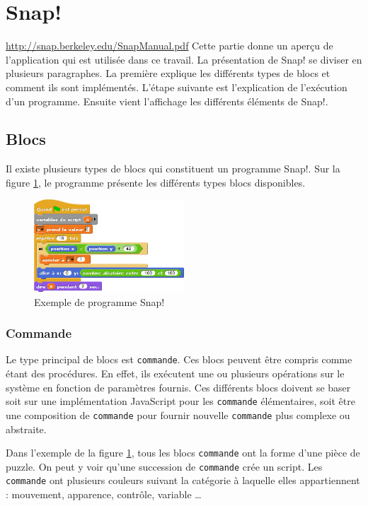 \section{Snap!}
\url{http://snap.berkeley.edu/SnapManual.pdf} %
Cette partie donne un aperçu de l'application qui est utilisée dans ce travail. La présentation de Snap! se diviser en plusieurs paragraphes. La première explique les différents types de blocs et comment ils sont implémentés. L'étape suivante est l'explication de l'exécution d'un programme. Ensuite vient l'affichage les différents éléments de Snap!. %

\subsection{Blocs}
Il existe plusieurs types de blocs qui constituent un programme Snap!. Sur la figure \ref{fig:software-used-script}, le programme présente les différents types blocs disponibles.
\begin{figure}
  \begin{center}
    \includegraphics[width=0.5\textwidth]{content/5-related_work/images/script}
    \caption{Exemple de programme Snap!}
    \label{fig:software-used-script}
  \end{center}
\end{figure}

\subsubsection{Commande}
Le type principal de blocs est \texttt{commande}. Ces blocs peuvent être compris comme étant des procédures. En effet, ils exécutent une ou plusieurs opérations sur le système en fonction de paramètres fournis. Ces différents blocs doivent se baser soit sur une implémentation JavaScript pour les \texttt{commande} élémentaires, soit être une composition de \texttt{commande} pour fournir nouvelle \texttt{commande} plus complexe ou abstraite.

Dans l'exemple de la figure \ref{fig:software-used-script}, tous les blocs \texttt{commande} ont la forme d'une pièce de puzzle. On peut y voir qu'une succession de \texttt{commande} crée un script. Les \texttt{commande} ont plusieurs couleurs suivant la catégorie à laquelle elles appartiennent : mouvement, apparence, contrôle, variable \ldots

